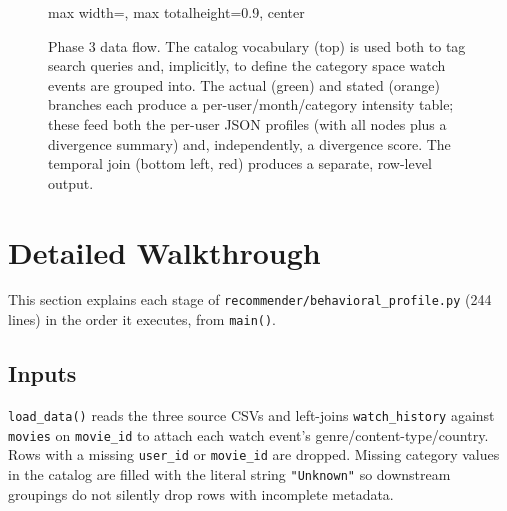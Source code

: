 \documentclass[11pt,a4paper]{article}
\newcommand{\code}[1]{\texttt{#1}}
\begin{document}
\begin{figure}[H]
\begin{adjustbox}{max width=\textwidth, max totalheight=0.9\textheight, center}
\end{adjustbox}
\caption{Phase 3 data flow. The catalog vocabulary (top) is used both to tag search queries and,
implicitly, to define the category space watch events are grouped into. The actual (green) and
stated (orange) branches each produce a per-user/month/category intensity table; these feed both
the per-user JSON profiles (with all nodes plus a divergence summary) and, independently, a
divergence score. The temporal join (bottom left, red) produces a separate, row-level output.}
\label{fig:overview}
\end{figure}

\newpage
\section{Detailed Walkthrough}

This section explains each stage of \code{recommender/behavioral\_profile.py} (244 lines) in the
order it executes, from \code{main()}.

\subsection{Inputs}

\code{load\_data()} reads the three source CSVs and left-joins \code{watch\_history} against
\code{movies} on \code{movie\_id} to attach each watch event's genre/content-type/country. Rows
with a missing \code{user\_id} or \code{movie\_id} are dropped. Missing category values in the
catalog are filled with the literal string \code{"Unknown"} so downstream groupings do not
silently drop rows with incomplete metadata.
\end{document}
